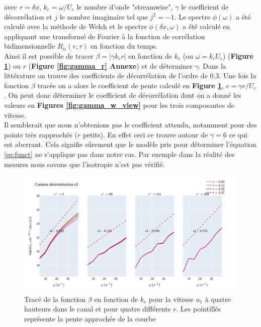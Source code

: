 \documentclass[12pt]{article}
\theoremstyle{plain}
\theoremstyle{remark}
\begin{document}
avec $r = \delta x$, $k_c=\omega/U_c$ le nombre d'onde "streamwise", $\gamma$ le coefficient de décorrélation et $j$ le nombre imaginaire tel que $j^2=-1$. Le spectre $\phi(\omega)$ a été calculé avec la méthode de Welch et le spectre $\phi(\delta x, \omega)$ a été calculé en appliquant une transformé de Fourier à la fonction de corrélation bidimensionnelle $R_{ii}(r,\tau)$ en fonction du temps.\\
Ainsi il est possible de tracer $\beta = |\gamma k_c r|$ en fonction de $k_c$ (ou $\omega=k_c U_c$) ({\bf Figure \ref{fig:gamma_w}}) ou $r$ ({\bf Figure \ref{fig:gamma_r} Annexe}) et de déterminer $\gamma$. Dans la littérature on trouve des coefficients de décorrélation de l'ordre de $0.3$. Une fois la fonction $\beta$ tracée on a alors le coefficient de pente calculé en {\bf Figure \ref{fig:gamma_w}}, $c=\gamma r / U_c$. On peut donc déterminer le coefficient de décorrélation dont on a donné les valeurs en {\bf Figures \ref{fig:gamma_w_view}} pour les trois composantes de vitesse. \\
Il semblerait que nous n'obtenions pas le coefficient attendu, notamment pour des points très rapprochés ($r$ petits). En effet ceci ce trouve autour de $\gamma = 6$ ce qui est aberrant. Cela signifie sûrement que le modèle pris pour déterminer l'équation \ref{eq:funct} ne s'applique pas dans notre cas. Par exemple dans la réalité des mesures nous savons que l'isotropie n'est pas vérifié.



\begin{figure}[H]
	\begin{center}
		\includegraphics[width=0.9\linewidth]{../../output/figures/channel_wrles_retau395/split_time/gamma/gamma_u1_w.png}
		\caption{Tracé de la fonction $\beta$ en fonction de $k_c$ pour la vitesse $u_1$ à quatre hauteurs dans le canal et pour quatre différents $r$. Les pointillés représente la pente approchée de la courbe}
		\label{fig:gamma_w}
	\end{center}
\end{figure}
\end{document}
